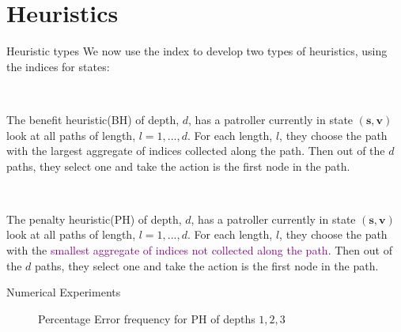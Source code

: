 \documentclass[10pt]{beamer}
\begin{document}
\section{Heuristics}
\begin{frame}{Heuristic types}
We now use the index to develop two types of heuristics, using the indices for states:

\
\pause

\begin{definition}
The benefit heuristic(BH) of depth, $d$, has a patroller currently in state $(\bm{s},\bm{v})$ look at all paths of length, $l=1,...,d$. For each length, $l$, they choose the path with the largest aggregate of indices collected along the path. Then out of the $d$ paths, they select one and take the action is the first node in the path.
\end{definition}

\
\pause

\begin{definition}
The penalty heuristic(PH) of depth, $d$, has a patroller currently in state $(\bm{s},\bm{v})$ look at all paths of length, $l=1,...,d$. For each length, $l$, they choose the path with the \textcolor{purple}{smallest aggregate of indices not collected along the path}. Then out of the $d$ paths, they select one and take the action is the first node in the path.
\end{definition}

\end{frame}


\begin{frame}{Numerical Experiments}

\begin{figure}[H]
\begin{center}
\resizebox{\linewidth}{!}{

}
\end{center}
\caption{Percentage Error frequency for PH of depths $1,2,3$}
\end{figure}

\end{frame}
\end{document}

